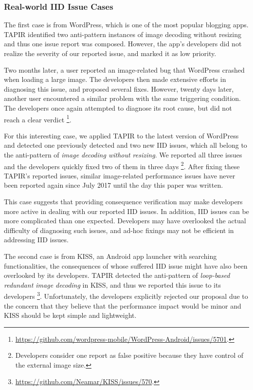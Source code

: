 \subsubsection{Real-world IID Issue Cases}

The first case is from WordPress, which is one of the most popular blogging apps.
TAPIR identified two anti-pattern instances of image decoding without resizing and thus one issue report was composed.
However, the app's developers did not realize the severity of our reported issue,
and marked it as low priority.

Two months later,
a user reported an image-related bug that WordPress crashed when loading a large image.
The developers then made extensive efforts in diagnosing this issue,
and proposed several fixes.
However, twenty days later, another user encountered a similar problem with the same triggering condition.
The developers once again attempted to diagnose its root cause,
but did not reach a clear verdict%
\footnote{\url{https://github.com/wordpress-mobile/WordPress-Android/issues/5701}.}.

For this interesting case,
we applied TAPIR to the latest version of WordPress and detected one previously detected and two new IID issues, which all belong to the anti-pattern of \emph{image decoding without resizing}.
We reported all three issues and the developers quickly fixed two of them in three days%
\footnote{Developers consider one report as false positive because they have control of the external image size.}.
After fixing these TAPIR's reported issues,
similar image-related performance issues have never been reported again since July 2017 until the day this paper was written.

This case suggests that providing consequence verification may make developers more active in dealing with our reported IID issues. In addition, IID issues can be more complicated than one expected.
Developers may have overlooked the actual difficulty of diagnosing such issues, and ad-hoc fixings may not be efficient in addressing IID issues.

The second case is from KISS, an Android app launcher with searching functionalities, the consequences of whose suffered IID issue might have also been overlooked by its developers. TAPIR detected the anti-pattern of \emph{loop-based redundant image decoding} in KISS, and thus we reported this issue to its developers%
\footnote{\url{https://github.com/Neamar/KISS/issues/570}.}.
Unfortunately, the developers explicitly rejected our proposal due to the concern that they believe that the performance impact would be minor and KISS should be kept simple and lightweight.
 
